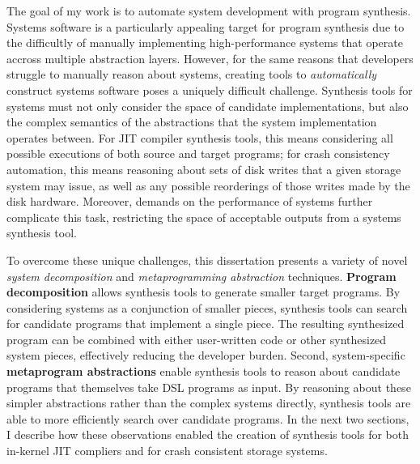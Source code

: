 The goal of my work is to automate system development with program synthesis.
Systems software is a particularly appealing target for program synthesis
due to the difficultly of manually implementing high-performance systems
that operate accross multiple abstraction layers.
However, for the same reasons that developers struggle to manually reason about systems,
creating tools to \textit{automatically} construct systems software poses
a uniquely difficult challenge.
Synthesis tools for systems must not only consider the space of candidate implementations,
but also the complex semantics of the abstractions that the system implementation operates between.
For JIT compiler synthesis tools, this means considering all possible executions of both source and target programs;
for crash consistency automation, this means reasoning about sets of disk writes
that a given storage system may issue,
as well as any possible reorderings of those writes made by the disk hardware.
Moreover, demands on the performance of systems further complicate this task,
restricting the space of acceptable outputs from a systems synthesis tool.

To overcome these unique challenges, this dissertation presents a variety of novel
\textit{system decomposition} and \textit{metaprogramming abstraction} techniques.
\textbf{Program decomposition} allows synthesis tools to generate smaller target programs.
By considering systems as a conjunction of smaller pieces,
synthesis tools can search for candidate programs that implement a single piece.
The resulting synthesized program can be combined with either user-written code or
other synthesized system pieces, effectively reducing the developer burden.
Second, system-specific \textbf{metaprogram abstractions} enable synthesis tools to reason 
about candidate programs that themselves take DSL programs as input.
By reasoning about these simpler abstractions rather than the complex systems directly,
synthesis tools are able to more efficiently search over candidate programs.
In the next two sections, I describe how these observations enabled the creation of
synthesis tools for both in-kernel JIT compliers and for crash consistent storage systems.

